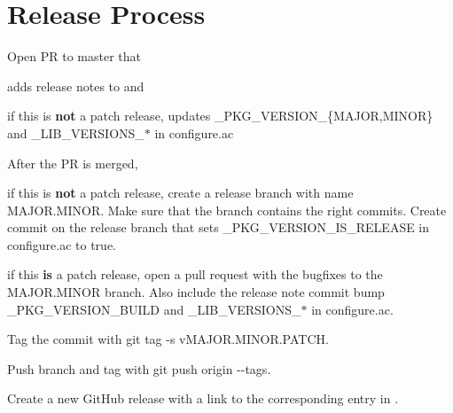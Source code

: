 \chapter{Release Process}
\hypertarget{md_libraries_2fc_2secp256k1_2secp256k1_2doc_2release-process}{}\label{md_libraries_2fc_2secp256k1_2secp256k1_2doc_2release-process}

\begin{DoxyEnumerate}
\item Open PR to master that
\begin{DoxyEnumerate}
\item adds release notes to {\ttfamily {}} and
\item if this is {\bfseries{not}} a patch release, updates {\ttfamily \+\_\+\+PKG\+\_\+\+VERSION\+\_\+\{MAJOR,MINOR\}} and {\ttfamily \+\_\+\+LIB\+\_\+\+VERSIONS\+\_\+\texorpdfstring{$\ast$}{*}} in {\ttfamily configure.\+ac}
\end{DoxyEnumerate}
\item After the PR is merged,
\begin{DoxyItemize}
\item if this is {\bfseries{not}} a patch release, create a release branch with name {\ttfamily MAJOR.\+MINOR}. Make sure that the branch contains the right commits. Create commit on the release branch that sets {\ttfamily \+\_\+\+PKG\+\_\+\+VERSION\+\_\+\+IS\+\_\+\+RELEASE} in {\ttfamily configure.\+ac} to {\ttfamily true}.
\item if this {\bfseries{is}} a patch release, open a pull request with the bugfixes to the {\ttfamily MAJOR.\+MINOR} branch. Also include the release note commit bump {\ttfamily \+\_\+\+PKG\+\_\+\+VERSION\+\_\+\+BUILD} and {\ttfamily \+\_\+\+LIB\+\_\+\+VERSIONS\+\_\+\texorpdfstring{$\ast$}{*}} in {\ttfamily configure.\+ac}.
\end{DoxyItemize}
\item Tag the commit with {\ttfamily git tag -\/s v\+MAJOR.\+MINOR.\+PATCH}.
\item Push branch and tag with {\ttfamily git push origin -\/-\/tags}.
\item Create a new Git\+Hub release with a link to the corresponding entry in {\ttfamily {}}. 
\end{DoxyEnumerate}